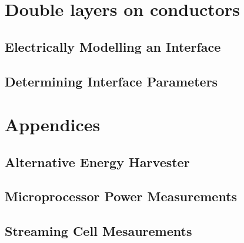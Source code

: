 \part{\label{part:doubleLayersOnConductors}Double layers on conductors}
    \chapter{Electrically Modelling an Interface}
        
    \chapter{Determining Interface Parameters}
        

\part{Appendices}
    \appendix
    \chapter{Alternative Energy Harvester}
        
    \chapter{Microprocessor Power Measurements}
        
    \chapter{Streaming Cell Mesaurements}
        







